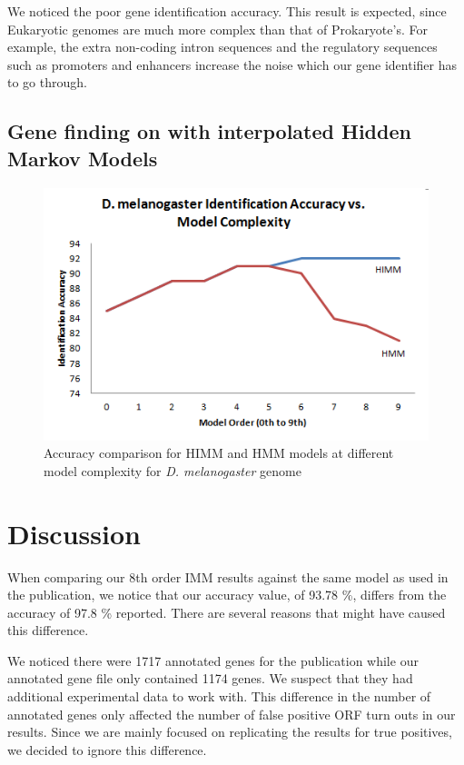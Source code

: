 \documentclass[11pt,letterpaper]{article}
\begin{document}
We noticed the poor gene identification accuracy. This result is expected, since Eukaryotic genomes are much more complex than that of Prokaryote’s. For example, the extra non-coding intron sequences and the regulatory sequences such as promoters and enhancers increase the noise which our gene identifier has to go through. 

\subsection{Gene finding on with interpolated Hidden Markov Models}


\begin{figure}
	\begin{center}
		\includegraphics[scale=0.8]{plots/accuracy_vs_model_complexity_drosophila_hmm.png}
	\end{center}
	\caption{\label{font-table} Accuracy comparison for HIMM and HMM models at different model complexity for \emph{D. melanogaster} genome}
\end{figure}


\section{Discussion}

When comparing our 8th order IMM results against the same model as used in the publication, we notice that our accuracy value, of 93.78 \%, differs from the accuracy of 97.8 \% reported. There are several reasons that might have caused this difference.

We noticed there were 1717 annotated genes for the publication while our annotated gene file only contained 1174 genes. We suspect that they had additional experimental data to work with. This difference in the number of annotated genes only affected the number of false positive ORF turn outs in our results. Since we are mainly focused on replicating the results for true positives, we decided to ignore this difference.
\end{document}
